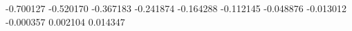 -0.700127
-0.520170
-0.367183
-0.241874
-0.164288
-0.112145
-0.048876
-0.013012
-0.000357
0.002104
0.014347
